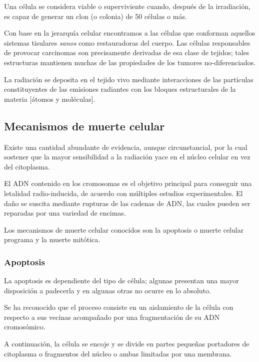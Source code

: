 \documentclass[12pt,letterpaper, oneside]{book}
\begin{document}
		Una célula se considera viable o superviviente cuando, después de la irradiación, es capaz de generar un clon (o colonia) de 50 células o más\cite{Tubiana.1990}.
		
		Con base en la jerarquía celular encontramos a las células que conforman aquellos sistemas tisulares \textit{sanos} como restauradoras del cuerpo\cite{Mayles.2007}. Las células responsables de provocar carcinomas son precisamente derivadas de esa clase de tejidos; tales estructuras mantienen muchas de las propiedades de los tumores no-diferenciados\cite{Mayles.2007}. 
		
		La radiación se deposita en el tejido vivo mediante interacciones de las partículas constituyentes de las emisiones radiantes con los bloques estructurales de la materia [átomos y moléculas]\cite{Hall.2000, Tubiana.1990, Mayles.2007}.
		
		
		\subsection{Mecanismos de muerte celular} 
		Existe una cantidad abundante de evidencia, aunque circunstancial, por la cual sostener que la mayor sensibilidad a la radiación yace en el núcleo celular en vez del citoplasma\cite{Bleehen.2007, Hall.2000}. 
		
		El ADN contenido en los cromosomas es el objetivo principal para conseguir una letalidad radio-inducida, de acuerdo con múltiples estudios experimentales\cite{Hall.2000, Mayles.2007}. El daño se suscita mediante rupturas de las cadenas de ADN, las cuales pueden ser reparadas por una variedad de encimas\cite{Bleehen.2007}.			
		
		Los mecanismos de muerte celular conocidos son la apoptosis o muerte celular programa y la muerte mitótica. 
		
			\subsubsection{Apoptosis}
			La apoptosis es dependiente del tipo de célula; algunas presentan una mayor disposición a padecerla y en algunas otras no ocurre en lo absoluto\cite{Hall.2000}.
			
			Se ha reconocido que el proceso consiste en un aislamiento de la célula con respecto a sus vecinas acompañado por una fragmentación de su ADN cromosómico\cite{Hall.2000}. 
			
			A continuación, la célula se encoje y se divide en partes pequeñas portadores de citoplasma o fragmentos del núcleo o ambas limitadas por una membrana\cite{Hall.2000}.
			
\end{document}
